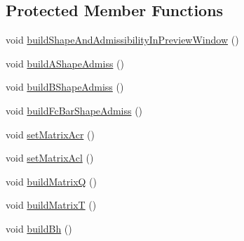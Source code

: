 \subsection*{\-Protected \-Member \-Functions}
\begin{DoxyCompactItemize}
\item 
void \hyperlink{classMIQPLinearConstraints_a2f41d99a16293718b94d17ce9ee5b59d}{build\-Shape\-And\-Admissibility\-In\-Preview\-Window} ()
\item 
void \hyperlink{classMIQPLinearConstraints_ae9b8c02ee58863d05d2aab41e780413e}{build\-A\-Shape\-Admiss} ()
\item 
void \hyperlink{classMIQPLinearConstraints_aa3752e85f1167129814b1a41d6b0198e}{build\-B\-Shape\-Admiss} ()
\item 
void \hyperlink{classMIQPLinearConstraints_a5231950d561e42e0d6590a398bec771c}{build\-Fc\-Bar\-Shape\-Admiss} ()
\item 
void \hyperlink{classMIQPLinearConstraints_ad36868550b3d1f977a67e76a44160192}{set\-Matrix\-Acr} ()
\item 
void \hyperlink{classMIQPLinearConstraints_a2985d200d8e6baba2df17abfeaca8882}{set\-Matrix\-Acl} ()
\item 
void \hyperlink{classMIQPLinearConstraints_a127e7ddd641f11d1b6137c59d80ef8b5}{build\-Matrix\-Q} ()
\item 
void \hyperlink{classMIQPLinearConstraints_addee397c47be26fd9eebbe8374c3cc30}{build\-Matrix\-T} ()
\item 
void \hyperlink{classMIQPLinearConstraints_ae6ecdf8d77474a8b099f2526d6cc0d75}{build\-Bh} ()
\end{DoxyCompactItemize}
